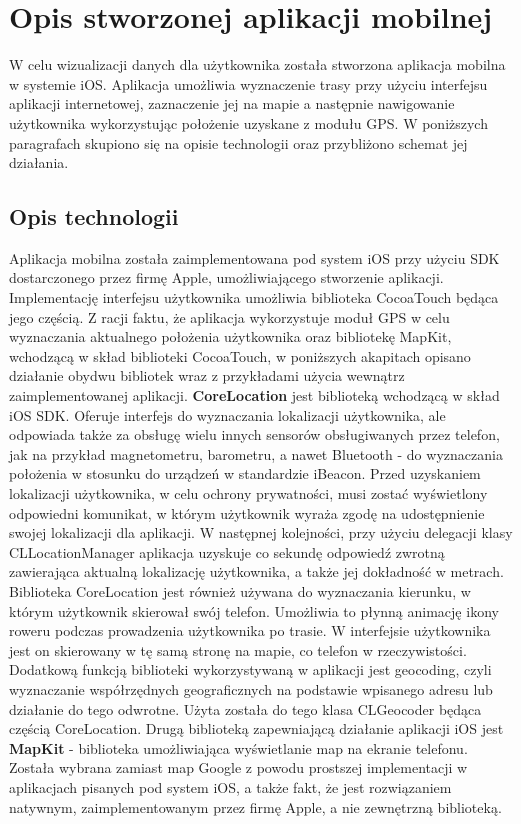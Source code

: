 \section{Opis stworzonej aplikacji mobilnej}

W celu wizualizacji danych dla użytkownika została stworzona aplikacja mobilna w systemie iOS. Aplikacja umożliwia wyznaczenie trasy przy użyciu interfejsu aplikacji internetowej, zaznaczenie jej na mapie a następnie nawigowanie użytkownika wykorzystując położenie uzyskane z modułu GPS. W poniższych paragrafach skupiono się na opisie technologii oraz przybliżono schemat jej działania.

\subsection{Opis technologii}

Aplikacja mobilna została zaimplementowana pod system iOS przy użyciu SDK dostarczonego przez firmę Apple, umożliwiającego stworzenie aplikacji. Implementację interfejsu użytkownika umożliwia biblioteka CocoaTouch będąca jego częścią. Z racji faktu, że aplikacja wykorzystuje moduł GPS w celu wyznaczania aktualnego położenia użytkownika oraz bibliotekę MapKit, wchodzącą w skład biblioteki CocoaTouch, w poniższych akapitach opisano działanie obydwu bibliotek wraz z przykładami użycia wewnątrz zaimplementowanej aplikacji. \newline
\textbf{CoreLocation} jest biblioteką wchodzącą w skład iOS SDK. Oferuje interfejs do wyznaczania lokalizacji użytkownika, ale odpowiada także za obsługę wielu innych sensorów obsługiwanych przez telefon, jak na przykład magnetometru, barometru, a nawet Bluetooth - do wyznaczania położenia w stosunku do urządzeń w standardzie iBeacon. Przed uzyskaniem lokalizacji użytkownika, w celu ochrony prywatności, musi zostać wyświetlony odpowiedni komunikat, w którym użytkownik wyraża zgodę na udostępnienie swojej lokalizacji dla aplikacji. W następnej kolejności, przy użyciu delegacji klasy CLLocationManager aplikacja uzyskuje co sekundę odpowiedź zwrotną zawierająca aktualną lokalizację użytkownika, a także jej dokładność w metrach. Biblioteka CoreLocation jest również używana do wyznaczania kierunku, w którym użytkownik skierował swój telefon. Umożliwia to płynną animację ikony roweru podczas prowadzenia użytkownika po trasie. W interfejsie użytkownika jest on skierowany w tę samą stronę na mapie, co telefon w rzeczywistości. Dodatkową funkcją biblioteki wykorzystywaną w aplikacji jest geocoding, czyli wyznaczanie współrzędnych geograficznych na podstawie wpisanego adresu lub działanie do tego odwrotne. Użyta została do tego klasa CLGeocoder będąca częścią CoreLocation. \newline
Drugą biblioteką zapewniającą działanie aplikacji iOS jest \textbf{MapKit} - biblioteka umożliwiająca wyświetlanie map na ekranie telefonu. Została wybrana zamiast map Google z powodu prostszej implementacji w aplikacjach pisanych pod system iOS, a także fakt, że jest rozwiązaniem natywnym, zaimplementowanym przez firmę Apple, a nie zewnętrzną biblioteką.

